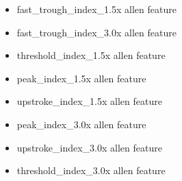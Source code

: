 \begin{itemize}

    \item fast\_trough\_index\_1.5x allen feature
    \item fast\_trough\_index\_3.0x allen feature
    \item threshold\_index\_1.5x allen feature
    \item peak\_index\_1.5x allen feature
    \item upstroke\_index\_1.5x allen feature
    \item peak\_index\_3.0x allen feature
    \item upstroke\_index\_3.0x allen feature
    \item threshold\_index\_3.0x allen feature
\end{itemize}



